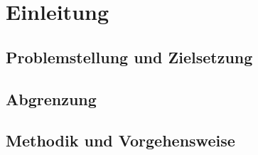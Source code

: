 \section{Einleitung}
\subsection{Problemstellung und Zielsetzung}
\subsection{Abgrenzung}
\subsection{Methodik und Vorgehensweise}